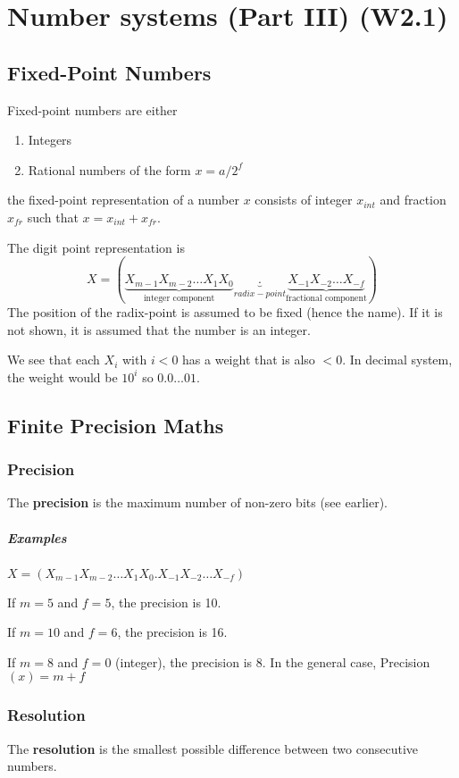\documentclass[10pt,a4paper]{book}
\begin{document}
\chapter{Number systems (Part III) (W2.1)}
\section{Fixed-Point Numbers}
Fixed-point numbers are either
\begin{enumerate}
\item Integers
\item Rational numbers of the form $x=a/2^f$
\end{enumerate}
the fixed-point representation of a number $x$ consists of integer $x_{int}$ and fraction $x_{fr}$ such that $x=x_{int}+x_{fr}$.\par
The digit point representation is 
\[X=(\underbrace{X_{m-1}X_{m-2}\ldots X_1X_0}_{\text{integer component}}\underbrace{.}_{radix-point}\underbrace{X_{-1}X_{-2}\ldots X_{-f}}_{\text{fractional component}})\]
The position of the radix-point is assumed to be fixed (hence the name). If it is not shown, it is assumed that the number is an integer.\par 
We see that each $X_i$ with $i<0$ has a weight that is also $<0$. In decimal system, the weight would be $10^i$ so $0.0\ldots01$.

\section{Finite Precision Maths}

\subsection{Precision}
The \textbf{precision} is the maximum number of non-zero bits (see earlier).
\paragraph{Examples} $X=(X_{m-1}X_{m-2}\ldots X_1X_0.X_{-1}X_{-2}\ldots X_{-f})$\par 
If $m=5$ and $f=5$, the precision is 10.\par 
If $m=10$ and $f=6$, the precision is 16.\par 
If $m=8$ and $f=0$ (integer), the precision is 8.
\medskip
In the general case, Precision$(x)=m+f$

\subsection{Resolution}
The \textbf{resolution} is the smallest possible difference between two consecutive numbers.
\end{document}
